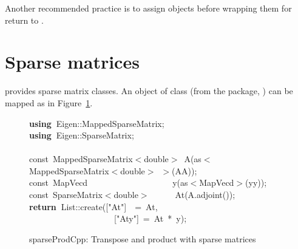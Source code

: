\documentclass[shortnames,article]{jss}
\newcommand{\hlstd}[1]{\textcolor[rgb]{0,0,0}{#1}}
\newcommand{\hlopt}[1]{\textcolor[rgb]{0,0,0}{#1}}
\newcommand{\hlstr}[1]{\textcolor[rgb]{0.90,0.15,0.15}{#1}}
\newcommand{\hlkwa}[1]{\textcolor[rgb]{0.61,0.13,0.93}{\bf{#1}}}
\newcommand{\hlkwb}[1]{\textcolor[rgb]{0.13,0.54,0.13}{#1}}
\newcommand{\hlkwd}[1]{\textcolor[rgb]{0,0,0}{#1}}
\begin{document}
Another recommended practice is to assign objects before wrapping them
for return to .

\section{Sparse matrices}
\label{sec:sparse}

 provides sparse matrix classes.  An  object of
class  (from the  package, \citep{CRAN:Matrix}) can be mapped as in Figure~\ref{sparseProd}.

\begin{figure}[htb]
  \noindent
  \ttfamily
  \hlstd{}\hlkwa{using\ }\hlstd{Eigen}\hlopt{::}\hlstd{MappedSparseMatrix}\hlopt{;}\hspace*{\fill}\\
  \hlstd{}\hlkwa{using\ }\hlstd{Eigen}\hlopt{::}\hlstd{SparseMatrix}\hlopt{;}\hspace*{\fill}\\
  \hlstd{}\hspace*{\fill}\\
  \hlkwb{const\ }\hlstd{MappedSparseMatrix}\hlopt{$<$}\hlstd{}\hlkwb{double}\hlstd{}\hlopt{$>$\ }\hlstd{}\hlkwd{A}\hlstd{}\hlopt{(}\hlstd{as}\hlopt{$<$}\hlstd{MappedSparseMatrix}\hlopt{$<$}\hlstd{}\hlkwb{double}\hlstd{}\hlopt{$>$\ $>$(}\hlstd{AA}\hlopt{));}\hspace*{\fill}\\
  \hlstd{}\hlkwb{const\ }\hlstd{MapVecd}\hlstd{\ \ \ \ \ \ \ \ \ \ \ \ \ \ \ \ \ \ \ \ }\hlstd{}\hlkwd{y}\hlstd{}\hlopt{(}\hlstd{as}\hlopt{$<$}\hlstd{MapVecd}\hlopt{$>$(}\hlstd{yy}\hlopt{));}\hspace*{\fill}\\
  \hlstd{}\hlkwb{const\ }\hlstd{SparseMatrix}\hlopt{$<$}\hlstd{}\hlkwb{double}\hlstd{}\hlopt{$>$}\hlstd{\ \ \ \ \ \ }\hlopt{}\hlstd{}\hlkwd{At}\hlstd{}\hlopt{(}\hlstd{A}\hlopt{.}\hlstd{}\hlkwd{adjoint}\hlstd{}\hlopt{());}\hspace*{\fill}\\
  \hlstd{}\hlkwa{return\ }\hlstd{List}\hlopt{::}\hlstd{}\hlkwd{create}\hlstd{}\hlopt{(}\hlstd{\textunderscore }\hlopt{{[}}\hlstd{}\hlstr{"At"}\hlstd{}\hlopt{{]}}\hlstd{\ \ }\hlopt{=\ }\hlstd{At}\hlopt{,}\hspace*{\fill}\\
  \hlstd{}\hlstd{\ \ \ \ \ \ \ \ \ \ \ \ \ \ \ \ \ \ \ \ }\hlstd{\textunderscore }\hlopt{{[}}\hlstd{}\hlstr{"Aty"}\hlstd{}\hlopt{{]}\ =\ }\hlstd{At\ }\hlopt{{*}\ }\hlstd{y}\hlopt{);}\hlstd{}\hspace*{\fill}\\
  \mbox{}
  \normalfont
  \normalsize
  \caption{sparseProdCpp: Transpose and product with sparse matrices}
  \label{sparseProd}
\end{figure}
\end{document}
